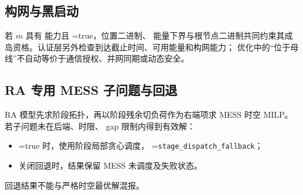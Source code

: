 \subsection{构网与黑启动}
若 $m$ 具有  能力且 =true，位置二进制、
能量下界与根节点二进制共同约束其成岛资格。认证层另外检查到达截止时间、可用能量和构网能力；
优化中的“位于母线”不自动等价于通信授权、并网同期或动态安全。

\subsection{RA 专用 MESS 子问题与回退}
RA 模型先求阶段拓扑，再以阶段残余切负荷作为右端项求 MESS 时空 MILP。若子问题未在后端、时限、
gap 限制内得到有效解：
\begin{itemize}
 \item {}=true 时，使用阶段局部贪心调度，
       =\texttt{stage\_dispatch\_fallback}；
 \item 关闭回退时，结果保留 MESS 未调度及失败状态。
\end{itemize}
回退结果不能与严格时空最优解混报。
